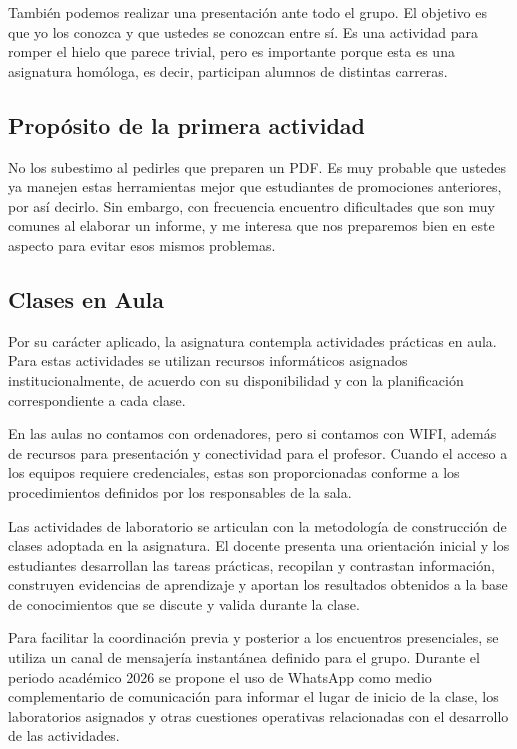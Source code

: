 \documentclass[12pt,a4paper]{article}
\begin{document}
También podemos realizar una presentación ante todo el grupo. El objetivo es que yo los conozca y que ustedes se conozcan entre sí. Es una actividad para romper el hielo que parece trivial, pero es importante porque esta es una asignatura homóloga, es decir, participan alumnos de distintas carreras.

\subsection{Propósito de la primera actividad}

No los subestimo al pedirles que preparen un PDF. Es muy probable que ustedes ya manejen estas herramientas mejor que estudiantes de promociones anteriores, por así decirlo. Sin embargo, con frecuencia encuentro dificultades que son muy comunes al elaborar un informe, y me interesa que nos preparemos bien en este aspecto para evitar esos mismos problemas.

\subsection{Clases en Aula}

Por su carácter aplicado, la asignatura contempla actividades prácticas en aula. Para estas actividades se utilizan recursos informáticos asignados institucionalmente, de acuerdo con su disponibilidad y con la planificación correspondiente a cada clase.\parencite{armoa2026planeamiento}

En las aulas no contamos con ordenadores, pero si contamos con WIFI, además de recursos para presentación y conectividad para el profesor. Cuando el acceso a los equipos requiere credenciales, estas son proporcionadas conforme a los procedimientos definidos por los responsables de la sala.

Las actividades de laboratorio se articulan con la metodología de construcción de clases adoptada en la asignatura. El docente presenta una orientación inicial y los estudiantes desarrollan las tareas prácticas, recopilan y contrastan información, construyen evidencias de aprendizaje y aportan los resultados obtenidos a la base de conocimientos que se discute y valida durante la clase.

Para facilitar la coordinación previa y posterior a los encuentros presenciales, se utiliza un canal de mensajería instantánea definido para el grupo. Durante el periodo académico 2026 se propone el uso de WhatsApp como medio complementario de comunicación para informar el lugar de inicio de la clase, los laboratorios asignados y otras cuestiones operativas relacionadas con el desarrollo de las actividades.
\end{document}
